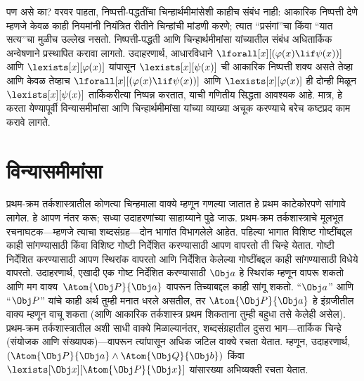 पण असे का? वरवर पाहता, निष्पत्ती-पद्धतींचा चिन्हार्थमीमांसेशी
काहीच संबंध नाही: आकारिक निष्पत्ती देणे म्हणजे केवळ काही
नियमांनी नियंत्रित रीतीने चिन्हांची मांडणी करणे; त्यात ``प्रसंगां''चा
किंवा ``यात सत्य''चा मुळीच उल्लेख नसतो. निष्पत्ती-पद्धती आणि
चिन्हार्थमीमांसा यांच्यातील संबंध अधितार्किक अन्वेषणाने प्रस्थापित
करावा लागतो. उदाहरणार्थ, आधारविधाने
$\lforall[x][(\varphi(x) \lif \psi(x))]$ आणि $\lexists[x][\varphi(x)]$ यांपासून
$\lexists[x][\psi(x)]$ ची आकारिक निष्पत्ती शक्य असते तेव्हा आणि
केवळ तेव्हाच $\lforall[x][(\varphi(x) \lif \psi(x))]$ आणि
$\lexists[x][\varphi(x)]$ ही दोन्ही मिळून
$\lexists[x][\psi(x)]$ तार्किकरीत्या निष्पन्न करतात, याची गणितीय
सिद्धता आवश्यक आहे. मात्र, हे करता येण्यापूर्वी विन्यासमीमांसा आणि
चिन्हार्थमीमांसा यांच्या व्याख्या अचूक करण्याचे बरेच कष्टप्रद काम
करावे लागते.












\section{विन्यासमीमांसा}\label{fol:int:syn:sec}

प्रथम-क्रम तर्कशास्त्रातील कोणत्या चिन्हमाला वाक्ये म्हणून गणल्या
जातात हे प्रथम काटेकोरपणे सांगावे लागेल. हे आपण नंतर करू; सध्या
उदाहरणांच्या साहाय्याने पुढे जाऊ. प्रथम-क्रम तर्कशास्त्राचे मूलभूत
रचनाघटक---म्हणजे त्याचा शब्दसंग्रह---दोन भागांत विभागलेले आहेत. पहिल्या
भागात विशिष्ट गोष्टींबद्दल काही सांगण्यासाठी किंवा विशिष्ट गोष्टी
निर्देशित करण्यासाठी आपण वापरतो ती चिन्हे येतात. गोष्टी निर्देशित
करण्यासाठी आपण स्थिरांक वापरतो आणि निर्देशित केलेल्या गोष्टींबद्दल
काही सांगण्यासाठी विधेये वापरतो. उदाहरणार्थ, एखादी एक गोष्ट
निर्देशित करण्यासाठी $\Obj a$ हे स्थिरांक म्हणून वापरू शकतो आणि मग
वाक्य~$\Atom{\Obj P}{\Obj a}$ वापरून तिच्याबद्दल काही सांगू शकतो.
``$\Obj a$'' आणि ``$\Obj P$'' यांचे काही अर्थ तुम्ही मनात धरले असतील,
तर $\Atom{\Obj P}{\Obj a}$ हे इंग्रजीतील वाक्य म्हणून वाचू शकता (आणि
आकारिक तर्कशास्त्र प्रथम शिकताना तुम्ही बहुधा तसे केलेही असेल).
प्रथम-क्रम तर्कशास्त्रातील अशी साधी वाक्ये मिळाल्यानंतर,
शब्दसंग्रहातील दुसरा भाग---तार्किक चिन्हे (संयोजक आणि संख्यापक)---वापरून
त्यांपासून अधिक जटिल वाक्ये रचता येतात. म्हणून, उदाहरणार्थ,
$(\Atom{\Obj P}{\Obj a} \land \Atom{\Obj Q}{\Obj b})$ किंवा
~$\lexists[\Obj x][\Atom{\Obj P}{\Obj x}]$ यांसारख्या अभिव्यक्ती
रचता येतात.

